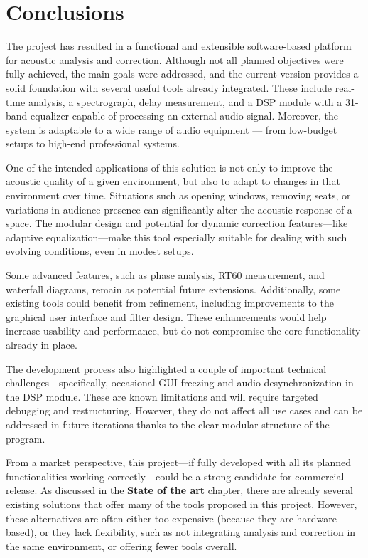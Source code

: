 \chapter{Conclusions}

The project has resulted in a functional and extensible software-based platform for acoustic analysis and correction. Although not all planned objectives were fully achieved, the main goals were addressed, and the current version provides a solid foundation with several useful tools already integrated. These include real-time analysis, a spectrograph, delay measurement, and a DSP module with a 31-band equalizer capable of processing an external audio signal. Moreover, the system is adaptable to a wide range of audio equipment — from low-budget setups to high-end professional systems.

One of the intended applications of this solution is not only to improve the acoustic quality of a given environment, but also to adapt to changes in that environment over time. Situations such as opening windows, removing seats, or variations in audience presence can significantly alter the acoustic response of a space. The modular design and potential for dynamic correction features—like adaptive equalization—make this tool especially suitable for dealing with such evolving conditions, even in modest setups.

Some advanced features, such as phase analysis, RT60 measurement, and waterfall diagrams, remain as potential future extensions. Additionally, some existing tools could benefit from refinement, including improvements to the graphical user interface and filter design. These enhancements would help increase usability and performance, but do not compromise the core functionality already in place.

The development process also highlighted a couple of important technical challenges—specifically, occasional GUI freezing and audio desynchronization in the DSP module. These are known limitations and will require targeted debugging and restructuring. However, they do not affect all use cases and can be addressed in future iterations thanks to the clear modular structure of the program.

From a market perspective, this project—if fully developed with all its planned functionalities working correctly—could be a strong candidate for commercial release. As discussed in the \textbf{State of the art} chapter, there are already several existing solutions that offer many of the tools proposed in this project. However, these alternatives are often either too expensive (because they are hardware-based), or they lack flexibility, such as not integrating analysis and correction in the same environment, or offering fewer tools overall.

